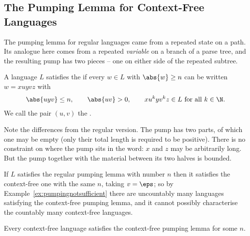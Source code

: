 
\subsection{The Pumping Lemma for Context-Free Languages}

The pumping lemma for regular languages came from a repeated state on a path. Its analogue here comes from a repeated \emph{variable} on a branch of a parse tree, and the resulting pump has two pieces -- one on either side of the repeated subtree.

\begin{definition}
	A language $L$ satisfies the  if every $w \in L$ with $\abs{w} \geq n$ can be written $w = xuyvz$ with
	$$\abs{uyv} \leq n, \qquad \abs{uv} > 0, \qquad xu^kyv^kz \in L \text{ for all } k \in \N.$$
	We call the pair $(u,v)$ the .
\end{definition}

\begin{remark}
	Note the differences from the regular version. The pump has two parts, of which one may be empty (only their total length is required to be positive). There is no constraint on where the pump sits in the word: $x$ and $z$ may be arbitrarily long. But the pump together with the material between its two halves is bounded.

	If $L$ satisfies the regular pumping lemma with number $n$ then it satisfies the context-free one with the same $n$, taking $v = \eps$; so by Example~\ref{ex:pumpingnotsufficient} there are uncountably many languages satisfying the context-free pumping lemma, and it cannot possibly characterise the countably many context-free languages.
\end{remark}

\begin{theorem}\label{thm:cfpumping}
	Every context-free language satisfies the context-free pumping lemma for some $n$.
\end{theorem}

